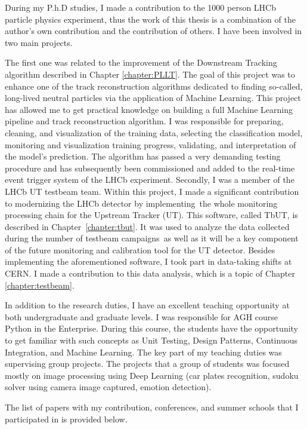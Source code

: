 During my P.h.D studies, I made a contribution to the 1000 person LHCb particle physics experiment, thus the work of this thesis is a combination of the author's own contribution and the contribution of others. I have been involved in two main projects.

The first one was related to the improvement of the Downstream Tracking algorithm described in Chapter \ref{chapter:PLLT}. The goal of this project was to enhance one of the track reconstruction algorithms dedicated to finding so-called, long-lived neutral particles via the application of Machine Learning. This project has allowed me to get practical knowledge on building a full Machine Learning pipeline and track reconstruction algorithm. I was responsible for preparing, cleaning, and visualization of the training data, selecting the classification model, monitoring and visualization training progress, validating, and interpretation of the model’s prediction. The algorithm has passed a very demanding testing procedure and has subsequently been commissioned and added to the real-time event trigger system of the LHCb experiment.
Secondly, I was a member of the LHCb UT testbeam team. Within this project, I made a significant contribution to modernizing the LHCb detector by implementing the whole monitoring processing chain for the Upstream Tracker (UT). This software, called TbUT, is described in Chapter~\ref{chapter:tbut}. It was used to analyze the data collected during the number of testbeam campaigns as well as it will be a key component of the future monitoring and calibration tool for the UT detector. Besides implementing the aforementioned software, I took part in data-taking shifts at CERN. I made a contribution to this data analysis, which is a topic of Chapter \ref{chapter:testbeam}.

In addition to the research duties, I have an excellent teaching opportunity at both undergraduate and graduate levels. I was responsible for AGH course Python in the Enterprise. During this course, the students have the opportunity to get familiar with such concepts as Unit Testing, Design Patterns, Continuous Integration, and Machine Learning. The key part of my teaching duties was supervising group projects. The projects that a group of students was focused mostly on image processing using Deep Learning (car plates recognition, sudoku solver using camera image captured, emotion detection).

The list of papers with my contribution, conferences, and summer schools that I participated in is provided below. 

